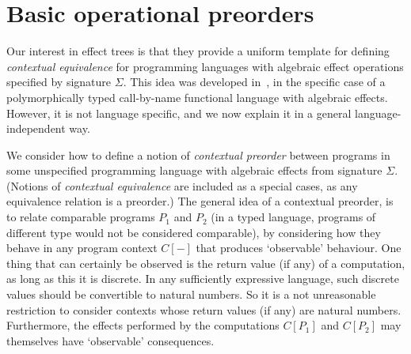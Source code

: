 \section{Basic operational preorders}

Our interest in effect trees is that they provide a 
uniform template for defining 
 \emph{contextual equivalence} for programming languages with algebraic effect operations
specified by signature $\Sigma$. This idea was developed in~\cite{gom}, in the specific case of a polymorphically typed call-by-name functional language with algebraic effects. However, it is not language specific, and we now explain it in a general language-independent way.

We consider how to define a notion of \emph{contextual preorder} between programs in some unspecified programming language with algebraic effects from signature $\Sigma$. (Notions of \emph{contextual equivalence}
are included as a special cases, as any equivalence relation is a preorder.) The general idea of a contextual preorder, is to relate comparable programs $P_1$ and $P_2$ (in a typed language, programs of different type would not be considered comparable), by considering how they behave in any program context $C[-]$ that produces `observable' behaviour. One thing that can certainly be observed is the return value (if any) of a computation, as long as this it is discrete. In any sufficiently expressive language, such discrete values should be convertible to natural numbers. So it is a not unreasonable  restriction to consider contexts whose return values (if any) are natural numbers. Furthermore, the effects performed by the computations $C[P_1]$ and $C[P_2]$ may themselves have `observable' consequences. 








